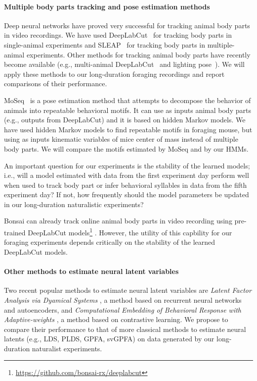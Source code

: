 \paragraph{Multiple body parts tracking and pose estimation methods}

Deep neural networks have proved very successful for tracking animal body parts
in video recordings.
%
We have used DeepLabCut~\citep{mathisEtAl18} for tracking body parts in
single-animal experiments and SLEAP~\citep{pereiraEtAl22} for tracking body
parts in multiple-animal experiments. Other methods for tracking animal body parts have
recently become available (e.g., multi-animal DeepLabCut~\citep{lauerEtAl22}
and lighting pose~\citep{bidermanEtAl23}).
%
We will apply these methods to our long-duration foraging recordings and report
comparisons of their performance.

MoSeq~\cite{wiltschkoEtAl15} is a pose estimation method that attempts to
decompose the behavior of animals into
repeatable behavioral motifs. It can use as inputs animal body parts (e.g.,
outputs from DeepLabCut) and it is based on hidden Markov models. We have used
hidden Markov models to find repeatable motifs in foraging mouse, but using
as inputs kinematic variables of mice center of mass instead of multiple body
parts.
%
We will compare the motifs estimated by MoSeq and by our HMMs.

An important question for our experiments is the stability of the learned
models; i.e., will a model estimated with data from the first experiment day
perform well when used to track body part or infer behavioral syllables in data
from the fifth experiment day? If not, how frequently should the model
parameters be updated in our long-duration naturalistic experiments?

Bonsai can already track online animal body parts in video recording using
pre-trained DeepLabCut
models\footnote{\url{https://github.com/bonsai-rx/deeplabcut}}
\citep{kaneEtAl20}. However, the utility of this capbility for our foraging
experiments depends critically on the stability of the learned DeepLabCut
models.

\paragraph{Other methods to estimate neural latent variables}

Two recent popular methods to estimate neural latent variables are \emph{Latent
Factor Analysis via Dyamical Systems} \citep[LFADS][]{pandarinathEtAl18}, a
method based on recurrent neural networks and autoencoders, and
\emph{Computational Embedding of Behavioral Response with Adaptive-weights}
\citep[CEBRA]{schneiderEtAl23}, a method based on contrastive learning. We
propose to compare their performance to that of more classical methods to
estimate neural latents (e.g., LDS, PLDS, GPFA, svGPFA) on data generated by
our long-duration naturalist experiments.

